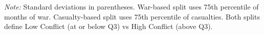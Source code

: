 \begin{table}[!h]
{\begin{tabular}[t]{lrrrr}
\end{tabular}

}
\end{table}
\footnotesize\textit{Note: } Standard deviations in parentheses. War-based split uses 75th percentile of months of war. Casualty-based split uses 75th percentile of casualties. Both splits define Low Conflict (at or below Q3) vs High Conflict (above Q3).
